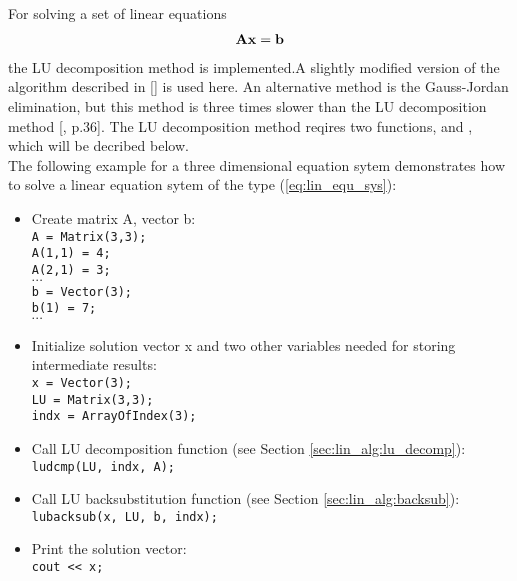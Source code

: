 For solving a set of linear equations 
\begin{eqnarray}
\label{eq:lin_equ_sys}
{\bf A} {\bf x} = {\bf b}
\end{eqnarray}
the LU decomposition method is implemented.A slightly modified version
of the algorithm described in
[\cite{numerical_recipes_C:96}] is used here. An alternative method
is the Gauss-Jordan elimination, but this method is three times
slower than the LU decomposition method
[\cite{numerical_recipes_C:96}, p.36]. The LU decomposition method
reqires two functions,  and ,
which will be decribed below.
\vspace{0.5cm}\\
The following example for a three dimensional equation sytem 
demonstrates how to solve a linear
equation sytem of the type
(\ref{eq:lin_equ_sys}):
\begin{itemize}
\item Create matrix A, vector b: \\
  \verb|A = Matrix(3,3);| \\
  \verb|A(1,1) = 4;|\\
  \verb|A(2,1) = 3;|\\
  $\cdots$\\
  \verb|b = Vector(3);|\\
  \verb|b(1) = 7;|\\
  $\cdots$
\item Initialize solution vector x and two other variables needed for
  storing intermediate results:\\
  \verb|x = Vector(3);|\\
  \verb|LU = Matrix(3,3);|\\
  \verb|indx = ArrayOfIndex(3);|
\item Call LU decomposition function (see Section \ref{sec:lin_alg:lu_decomp}): \\
  \verb|ludcmp(LU, indx, A);|
\item Call LU backsubstitution function (see Section \ref{sec:lin_alg:backsub}): \\
  \verb|lubacksub(x, LU, b, indx);|
\item Print the solution vector:\\
  \verb|cout << x;|
\end{itemize}

\label{sec:lin_alg:lu_decomp}

